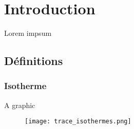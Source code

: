 
	\chapter{Introduction}
	Lorem impsum
		\section{Définitions}
			\subsection*{Isotherme}
			A graphic
			
				\begin{figure}[H]
					\begin{center}
						\texttt{[image: trace\_isothermes.png]}
					\end{center}
				\end{figure}
